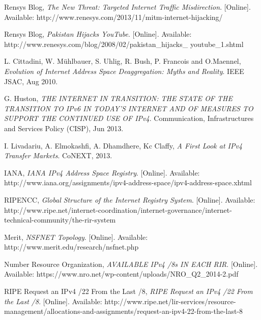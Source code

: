 \documentclass[11pt,a4paper]{scrreprt}
\begin{document}

\renewcommand\bibname{\chapter{References}}
\begin{thebibliography}{count}



    Rensys Blog,
    \emph{The New Threat: Targeted Internet Traffic Misdirection}.
    [Online]. Available: http://www.renesys.com/2013/11/mitm-internet-hijacking/


    Rensys Blog,
    \emph{Pakistan Hijacks YouTube}.
    [Online]. Available: http://www.renesys.com/blog/2008/02/pakistan\_hijacks\_
youtube\_1.shtml

	L. Cittadini, W. Mühlbauer, S. Uhlig, R. Bush, P. Francois and O.Maennel,
	\emph{Evolution of Internet Address Space Deaggregation: Myths and Reality}.
	IEEE JSAC, Aug 2010.

	G. Huston,
	\emph{THE INTERNET IN TRANSITION: THE STATE OF THE TRANSITION TO IPv6 IN TODAY'S
INTERNET AND OF MEASURES TO SUPPORT THE CONTINUED USE OF IPv4}.
	Communication, Infrastructures and Services Policy (CISP), Jun 2013.
	

	I. Livadariu, A. Elmokashfi, A. Dhamdhere, Kc Claffy,
	\emph{A First Look at IPv4 Transfer Markets}.
	CoNEXT, 2013.
	
	IANA,
	\emph{IANA IPv4 Address Space Registry}.
	[Online]. Available: http://www.iana.org/assignments/ipv4-address-space/ipv4-address-space.xhtml
	

	RIPENCC,
	\emph{Global Structure of the Internet Registry System}.
	[Online]. Available: http://www.ripe.net/internet-coordination/internet-governance/internet-technical-community/the-rir-system
	
	Merit,
	\emph{NSFNET Topology}.
	[Online]. Available: http://www.merit.edu/research/nsfnet.php	
	
	Number Resource Organization,
	\emph{AVAILABLE IPv4 /8s IN EACH RIR}.
	[Online]. Available: https://www.nro.net/wp-content/uploads/NRO\_Q2\_2014-2.pdf
	
	RIPE Request an IPv4 /22 From the Last /8,
	\emph{RIPE Request an IPv4 /22 From the Last /8}.
	[Online]. Available: http://www.ripe.net/lir-services/resource-management/allocations-and-assignments/request-an-ipv4-22-from-the-last-8


\end{thebibliography}
\end{document}
